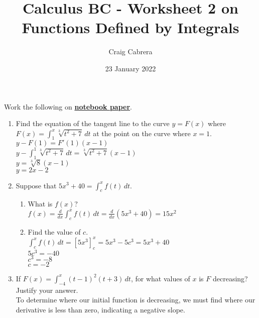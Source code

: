 \documentclass[10pt, letterpaper]{report}
\title{Calculus BC - Worksheet 2 on Functions Defined by Integrals}
\author{Craig Cabrera}
\date{23 January 2022}
\begin{document}
\maketitle
Work the following on \textbf{\underline{notebook paper}}.
\begin{enumerate}
  \item{Find the equation of the tangent line to the curve $y=F(x)$ where $F(x)=\int_{1}^{x}{\sqrt[3]{t^{2}+7}}\,dt$ at the point on the curve where $x=1$.} \\

    $y - F(1) = F'(1)(x - 1)$ \\

    $y - \int_{1}^{1}{\sqrt[3]{t^{2}+7}}\,dt = \sqrt[3]{t^{2}+7}(x - 1)$ \\

    $y = \sqrt[3]{8}(x - 1)$ \\

    $y = 2x - 2$

  \item{Suppose that $5x^{3}+40=\int_{c}^{x}{f(t)}\,dt$.}
  \begin{enumerate}
    \item{What is $f(x)$?} \\

      $f(x)=\frac{d}{dx}\int_{c}^{x}{f(t)}\,dt=\frac{d}{dx}(5x^{3}+40)=15x^{2}$ \\

    \item{Find the value of $c$.} \\

      $\int_{c}^{x}{f(t)}\,dt=[5x^{3}]_{c}^{x}=5x^{3} - 5c^{3} = 5x^{3} + 40$ \\

      $5c^{3}=-40$ \\

      $c^{3}=-8$ \\

      $c = -2$ \\

  \end{enumerate}
  \item{If $F(x)=\int_{-4}^{x}{(t-1)^{2}(t+3)}\,dt$, for what values of $x$ is $F$ decreasing? Justify your answer.} \\

    To determine where our initial function is decreasing, we must find where our derivative is less than zero, indicating a negative slope. \\


\end{enumerate}
\end{document}
